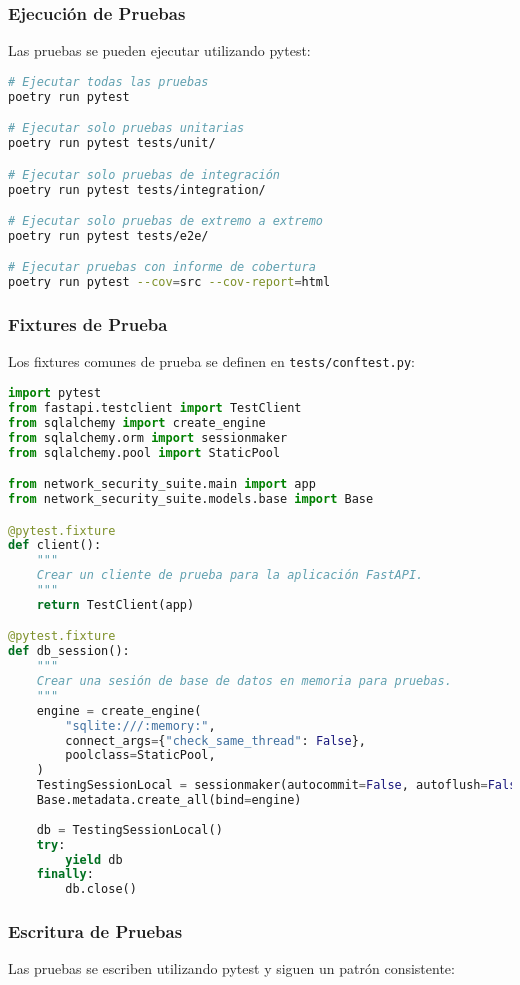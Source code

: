 \subsubsection{Ejecución de Pruebas}
Las pruebas se pueden ejecutar utilizando pytest:

\begin{lstlisting}[language=bash, caption=Ejecución de Pruebas]
# Ejecutar todas las pruebas
poetry run pytest

# Ejecutar solo pruebas unitarias
poetry run pytest tests/unit/

# Ejecutar solo pruebas de integración
poetry run pytest tests/integration/

# Ejecutar solo pruebas de extremo a extremo
poetry run pytest tests/e2e/

# Ejecutar pruebas con informe de cobertura
poetry run pytest --cov=src --cov-report=html
\end{lstlisting}

\subsubsection{Fixtures de Prueba}
Los fixtures comunes de prueba se definen en \texttt{tests/conftest.py}:

\begin{lstlisting}[language=python, caption=Ejemplo de Fixtures de Prueba]
import pytest
from fastapi.testclient import TestClient
from sqlalchemy import create_engine
from sqlalchemy.orm import sessionmaker
from sqlalchemy.pool import StaticPool

from network_security_suite.main import app
from network_security_suite.models.base import Base

@pytest.fixture
def client():
    """
    Crear un cliente de prueba para la aplicación FastAPI.
    """
    return TestClient(app)

@pytest.fixture
def db_session():
    """
    Crear una sesión de base de datos en memoria para pruebas.
    """
    engine = create_engine(
        "sqlite:///:memory:",
        connect_args={"check_same_thread": False},
        poolclass=StaticPool,
    )
    TestingSessionLocal = sessionmaker(autocommit=False, autoflush=False, bind=engine)
    Base.metadata.create_all(bind=engine)
    
    db = TestingSessionLocal()
    try:
        yield db
    finally:
        db.close()
\end{lstlisting}

\subsubsection{Escritura de Pruebas}
Las pruebas se escriben utilizando pytest y siguen un patrón consistente:

